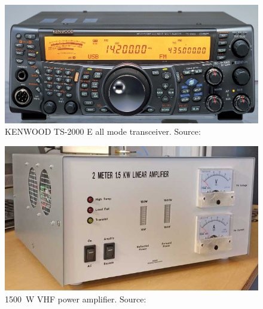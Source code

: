 \begin{minipage}{\linewidth}
    \centering
    \begin{minipage}{0.45\linewidth}
        \begin{figure}[H]
            \centering
            \includegraphics[width=0.35\paperwidth]{img/4/kenwood_ts2000.jpg}
            \caption{KENWOOD TS-2000 E all mode transceiver. Source: \cite{kenwood_ts2000}}
            \label{kenwood_ts2000}
        \end{figure}
    \end{minipage}
    \hspace{0.05\linewidth}
    \begin{minipage}{0.45\linewidth}
        \begin{figure}[H]
            \centering
            \includegraphics[width=0.35\paperwidth]{img/4/vhf_1500w_pa.jpg}
            \caption{\SI{1500}{\watt} VHF power amplifier. Source: \cite{vhf_1500w_pa}}
            \label{vhf_1500w_pa}
        \end{figure}
    \end{minipage}
\end{minipage}

